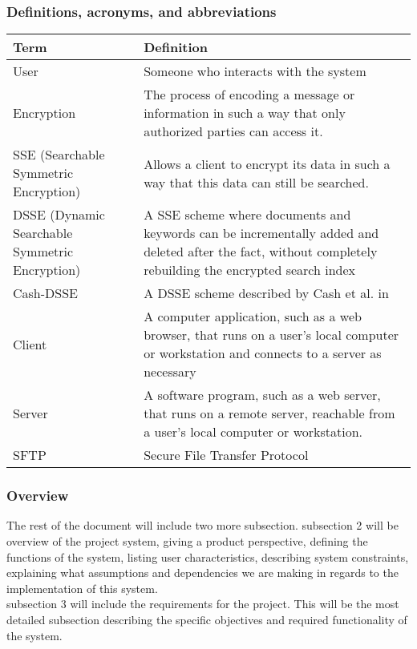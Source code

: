 \subsubsection{ Definitions, acronyms, and abbreviations }
    \begin{tabular}{| p{3.5cm} | p{12.5cm} |}
    \hline
	\textbf{Term} & \textbf{Definition} \\ \hline
    User & Someone who interacts with the system \\ \hline 
    Encryption & The process of encoding a message or information in such a way that only authorized parties can access it. \\ \hline
    SSE (Searchable Symmetric Encryption) & Allows a client to encrypt its data in such a way that this data can still be searched.  \\ \hline 
    DSSE (Dynamic Searchable Symmetric Encryption) & A SSE scheme where documents and keywords can be incrementally added and deleted after the fact, without completely rebuilding the encrypted search index  \\ \hline
    Cash-DSSE & A DSSE scheme described by Cash et al. in \cite{cash14} \\ \hline
    Client & A computer application, such as a web browser, that runs on a user's local computer or workstation and connects to a server as 		necessary \\ \hline
    Server &  A software program, such as a web server, that runs on a remote server, reachable from a user's local computer or workstation. \\ \hline 
    SFTP & Secure File Transfer Protocol \\ \hline      
    \end{tabular}

    
    
\subsubsection{ Overview }
The rest of the document will include two more subsection. subsection 2 will be overview of the project system, giving a product perspective, defining the functions of the system, listing user characteristics,  describing system constraints, explaining what assumptions and dependencies we are making in regards to the implementation of this system. \\
subsection 3 will include the requirements for the project. This will be the most detailed subsection describing the specific objectives and required functionality of the system. 


